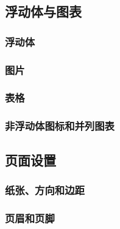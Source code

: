 \documentclass{ctexart}
\begin{document}
    \subsection{浮动体与图表}

        \subsubsection{浮动体}

        \subsubsection{图片}

        \subsubsection{表格}

        \subsubsection{非浮动体图标和并列图表}

    \subsection{页面设置}
        \subsubsection{纸张、方向和边距}

        \subsubsection{页眉和页脚}
\end{document}
